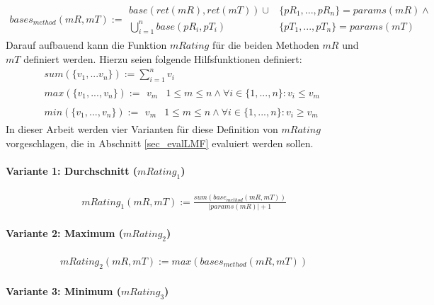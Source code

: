 \begin{gather*}
\mathit{bases_{method}(mR,mT)} := \begin{array}{l|l}
\mathit{base(ret(mR), ret(mT))} \cup \mathit{ }
&
\{\mathit{pR_1,...,pR_n}\} = \mathit{params(mR)} \wedge \mathit{ }
\\
\bigcup\limits_{i=1}^{n} \mathit{base(pR_i,pT_i)}
&
\{\mathit{pT_1,...,pT_n}\} = \mathit{params(mT)}
\end{array} 
\end{gather*}
\noindent
Darauf aufbauend kann die Funktion $\mathit{mRating}$ für die beiden Methoden $\mathit{mR}$ und $\mathit{mT}$ definiert werden. Hierzu seien folgende Hilfsfunktionen definiert:
\begin{gather*}
\mathit{sum(\{v_1,...v_n\})} := \sum_{i=1}^{n}v_i
\\
\mathit{max(\{v_1,...,v_n\})} := 
\begin{array}{l|l}
v_{m}
&
1 \leq m \leq n  \wedge \forall i \in  \{1,...,n\}: v_i \leq v_{m}
\end{array}
\\    
\mathit{min(\{v_1,...,v_n\})} := 
\begin{array}{l|l}
v_{m}
&
1 \leq m \leq n  \wedge \forall i \in  \{1,...,n\}: v_i \geq v_{m} 
\end{array}  
\end{gather*}
\noindent
In dieser Arbeit werden vier Varianten für diese Definition von $\mathit{mRating}$ vorgeschlagen, die in Abschnitt \ref{sec_evalLMF} evaluiert werden sollen.
\paragraph{Variante 1: Durchschnitt ($\mathit{mRating}_1$)}

\begin{gather*}
\mathit{mRating_1(mR,mT)} := \frac{\mathit{sum(base_{method}(mR,mT))}}{|\mathit{params(mR)}|+1}
\end{gather*}

\paragraph{Variante 2: Maximum ($\mathit{mRating}_2$)}

\begin{gather*}
\mathit{mRating_2(mR,mT)} := \mathit{max(bases_{method}(mR,mT))}
\end{gather*}

\paragraph{Variante 3: Minimum ($\mathit{mRating}_3$)}

